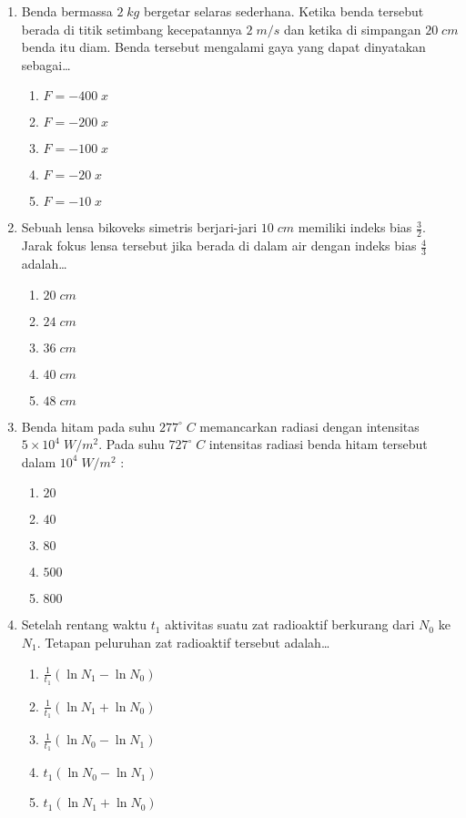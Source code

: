 \documentclass[A4,12PT, english, twocolumn]{journal}
\begin{document}
\begin{enumerate}
\item Benda bermassa $2 \; kg$ bergetar selaras sederhana. Ketika benda tersebut berada di titik setimbang kecepatannya $2 \; m/s$ dan ketika di simpangan $20 \; cm$ benda itu diam. Benda tersebut mengalami gaya yang dapat dinyatakan sebagai\dots
    \begin{enumerate}
        \item $F = -400 \; x$
        \item $F = -200 \; x$
        \item $F = -100 \; x$
        \item $F = -20 \; x$
        \item $F = -10 \; x$
    \end{enumerate}
 
\item Sebuah lensa bikoveks simetris berjari-jari $10 \; cm$ memiliki indeks bias $\frac{3}{2}$. Jarak fokus lensa tersebut jika berada di dalam air dengan indeks bias $\frac{4}{3}$ adalah\dots
    \begin{enumerate}
        \item $20 \; cm$
        \item $24 \; cm$
        \item $36 \; cm$
        \item $40 \; cm$
        \item $48 \; cm$
    \end{enumerate}

\item Benda hitam pada suhu $277^\circ \; C$ memancarkan radiasi dengan intensitas $5 \times 10^4 \; W/m^2$. Pada suhu $727^\circ \; C$ intensitas radiasi benda hitam tersebut dalam $10^4 \; W/m^2$ :
    \begin{enumerate}
        \item $20$
        \item $40$
        \item $80$
        \item $500$
        \item $800$
    \end{enumerate}

\item Setelah rentang waktu $t_1$ aktivitas suatu zat radioaktif berkurang dari $N_0$ ke $N_1$. Tetapan peluruhan zat radioaktif tersebut adalah\dots
    \begin{enumerate}
        \item $\frac{1}{t_1}\left( \ln N_1 - \ln N_0 \right)$
        \item $\frac{1}{t_1}\left( \ln N_1 + \ln N_0 \right)$
        \item $\frac{1}{t_1}\left( \ln N_0 - \ln N_1 \right)$
        \item $t_1 \left( \ln N_0 - \ln N_1 \right)$
        \item $t_1 \left( \ln N_1 + \ln N_0 \right)$
    \end{enumerate}


\end{enumerate}
\end{document}
